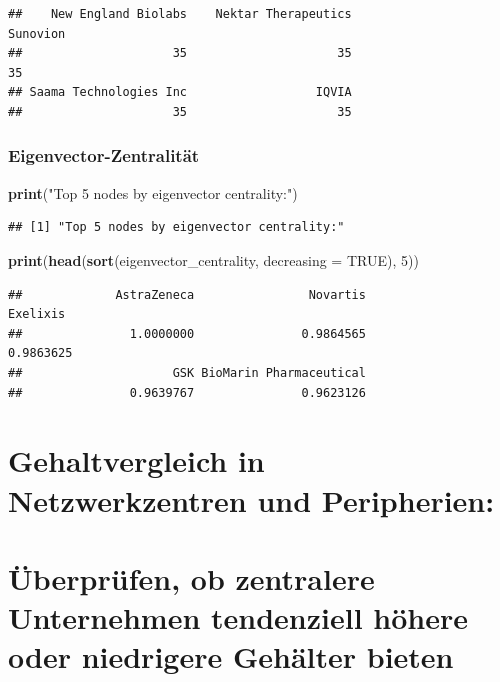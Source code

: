 \documentclass[
]{article}
\newenvironment{Shaded}{\begin{snugshade}}{\end{snugshade}}
\newcommand{\AttributeTok}[1]{\textcolor[rgb]{0.13,0.29,0.53}{#1}}
\newcommand{\ConstantTok}[1]{\textcolor[rgb]{0.56,0.35,0.01}{#1}}
\newcommand{\DecValTok}[1]{\textcolor[rgb]{0.00,0.00,0.81}{#1}}
\newcommand{\FunctionTok}[1]{\textcolor[rgb]{0.13,0.29,0.53}{\textbf{#1}}}
\newcommand{\NormalTok}[1]{#1}
\newcommand{\StringTok}[1]{\textcolor[rgb]{0.31,0.60,0.02}{#1}}
\begin{document}
\begin{verbatim}
##    New England Biolabs    Nektar Therapeutics               Sunovion 
##                     35                     35                     35 
## Saama Technologies Inc                  IQVIA 
##                     35                     35
\end{verbatim}

\subsubsection{Eigenvector-Zentralität}\label{eigenvector-zentralituxe4t}

\begin{Shaded}
\begin{Highlighting}[]
\FunctionTok{print}\NormalTok{(}\StringTok{"Top 5 nodes by eigenvector centrality:"}\NormalTok{)}
\end{Highlighting}
\end{Shaded}

\begin{verbatim}
## [1] "Top 5 nodes by eigenvector centrality:"
\end{verbatim}

\begin{Shaded}
\begin{Highlighting}[]
\FunctionTok{print}\NormalTok{(}\FunctionTok{head}\NormalTok{(}\FunctionTok{sort}\NormalTok{(eigenvector\_centrality, }\AttributeTok{decreasing =} \ConstantTok{TRUE}\NormalTok{), }\DecValTok{5}\NormalTok{))}
\end{Highlighting}
\end{Shaded}

\begin{verbatim}
##             AstraZeneca                Novartis                Exelixis 
##               1.0000000               0.9864565               0.9863625 
##                     GSK BioMarin Pharmaceutical 
##               0.9639767               0.9623126
\end{verbatim}

\section{Gehaltvergleich in Netzwerkzentren und
Peripherien:}\label{gehaltvergleich-in-netzwerkzentren-und-peripherien}

\section{Überprüfen, ob zentralere Unternehmen tendenziell höhere oder
niedrigere Gehälter
bieten}\label{uxfcberpruxfcfen-ob-zentralere-unternehmen-tendenziell-huxf6here-oder-niedrigere-gehuxe4lter-bieten}
\end{document}
